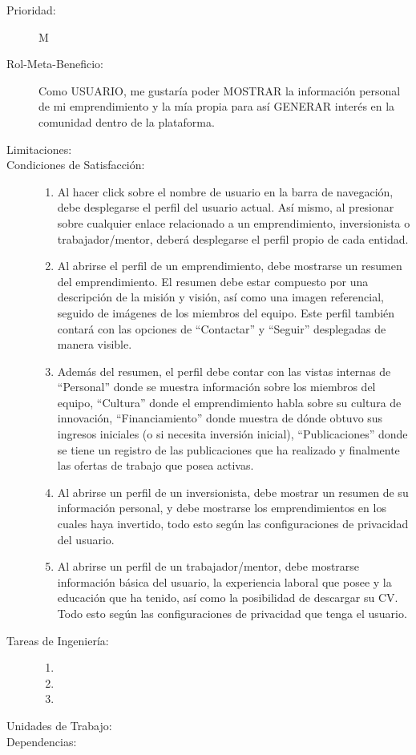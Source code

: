 \begin{description}
    \item[Prioridad:] M
    \item[Rol-Meta-Beneficio:] Como USUARIO, me gustaría poder MOSTRAR  la información personal de mi emprendimiento y la mía propia para así GENERAR interés en la comunidad dentro de la plataforma.
    \item[Limitaciones:] 
    \item[Condiciones de Satisfacción:]  \hfill
        \begin{enumerate}
            \item Al hacer click sobre el nombre de usuario en la barra de navegación, debe desplegarse el perfil del usuario actual. Así mismo, al presionar sobre cualquier enlace relacionado a un emprendimiento, inversionista o trabajador/mentor, deberá desplegarse el perfil propio de cada entidad.
		    \item Al abrirse el perfil de un emprendimiento, debe mostrarse un resumen del emprendimiento. El resumen debe estar compuesto por una descripción de la misión y visión, así como una imagen referencial, seguido de imágenes de los miembros del equipo. Este perfil también contará con las opciones de “Contactar” y “Seguir” desplegadas de manera visible. \item Además del resumen, el perfil debe contar con las vistas internas de “Personal” donde se muestra información sobre los miembros del equipo, “Cultura” donde el emprendimiento habla sobre su cultura de innovación, “Financiamiento” donde muestra de dónde obtuvo sus ingresos iniciales (o si necesita inversión inicial), “Publicaciones” donde se tiene un registro de las publicaciones que ha realizado y finalmente las ofertas de trabajo que posea activas.
		    \item Al abrirse un perfil de un inversionista, debe mostrar un resumen de su información personal, y debe mostrarse los emprendimientos en los cuales haya invertido, todo esto según las configuraciones de privacidad del usuario.
		    \item Al abrirse un perfil de un trabajador/mentor, debe mostrarse información básica del usuario, la experiencia laboral que posee y la educación que ha tenido, así como la posibilidad de descargar su CV. Todo esto según las configuraciones de privacidad que tenga el usuario.
        \end{enumerate}
    \item[Tareas de Ingeniería:]  \hfill
        \begin{enumerate}
            \item 
            \item 
            \item 
        \end{enumerate}
    \item[Unidades de Trabajo:]
    \item[Dependencias:]
\end{description}

\newpage
